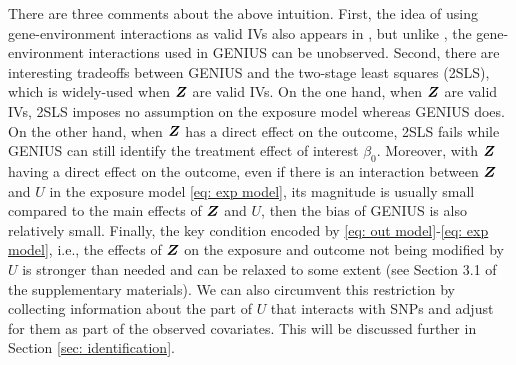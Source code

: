 \documentclass[12pt]{article}
\begin{document}
There are three comments about the above intuition. First, the idea of using gene-environment interactions as valid IVs also appears in \cite{Spiller:2019aa}, but unlike \cite{Spiller:2019aa}, the  gene-environment interactions used in GENIUS  can be unobserved. Second, there are interesting tradeoffs between GENIUS and the two-stage least squares (2SLS), which is widely-used when $ \bm{Z} $ are valid IVs. On the one hand, when $ \bm{Z} $ are valid IVs, 2SLS imposes no assumption on the exposure model whereas GENIUS does. On the other hand, when $ \bm{Z} $ has a direct effect on the outcome, 2SLS fails while GENIUS can still identify the treatment effect of interest $ \beta_0 $. Moreover, with $ \bm{Z} $ having a direct effect on the outcome,  even if there is an interaction between $ \bm{Z} $ and $ U $ in the exposure model \eqref{eq: exp model}, its magnitude is usually small compared to the main effects of $ \bm{Z} $ and $ U $, then the bias of GENIUS is also relatively small. Finally, the key condition encoded by   \eqref{eq: out model}-\eqref{eq: exp model}, i.e., the effects of $ \bm{Z} $ on the exposure and outcome not being modified by $ U $ is stronger than needed and can be relaxed to some extent (see Section 3.1 of the supplementary materials).  We can also circumvent this restriction by collecting information about the part of $ U $ that interacts with SNPs and adjust for them as part of the observed covariates. This will be discussed further in Section \ref{sec: identification}.
\end{document}
